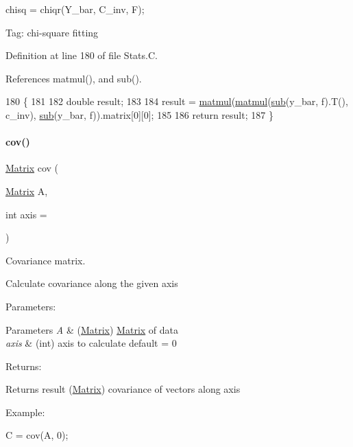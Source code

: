 chisq = chiqr(\+Y\+\_\+bar, C\+\_\+inv, F);

Tag\+: chi-\/square fitting 

Definition at line 180 of file Stats.\+C.



References matmul(), and sub().


\begin{DoxyCode}
180                                                    \{
181 
182   \textcolor{keywordtype}{double} result;
183 
184   result = \hyperlink{Matrix_8C_a74a9fe9c1d326c41a69926c97720f4d2}{matmul}(\hyperlink{Matrix_8C_a74a9fe9c1d326c41a69926c97720f4d2}{matmul}(\hyperlink{Matrix_8C_a238af1517ec23a6f0279ec5ee6364d6a}{sub}(y\_bar, f).T(), c\_inv), \hyperlink{Matrix_8C_a238af1517ec23a6f0279ec5ee6364d6a}{sub}(y\_bar, f)).matrix[0][0];
185 
186   \textcolor{keywordflow}{return} result;
187 \}
\end{DoxyCode}
\mbox{\label{Stats_8C_ac9e2628dd0e3b331f9113cf8d731b10c}} 
\paragraph{\texorpdfstring{cov()}{cov()}}
{\footnotesize\ttfamily \hyperlink{classMatrix}{Matrix} cov (\begin{DoxyParamCaption}\item[{\hyperlink{classMatrix}{Matrix}}]{A,  }\item[{int}]{axis = {} }\end{DoxyParamCaption})}



Covariance matrix. 

Calculate covariance along the given axis

Parameters\+: 
\begin{DoxyParams}{Parameters}
{\em A} & (\hyperlink{classMatrix}{Matrix}) \hyperlink{classMatrix}{Matrix} of data \\
\hline
{\em axis} & (int) axis to calculate default = 0\\
\hline
\end{DoxyParams}
Returns\+: \begin{DoxyReturn}{Returns}
result (\hyperlink{classMatrix}{Matrix}) covariance of vectors along axis
\end{DoxyReturn}
Example\+:

C = cov(\+A, 0);

